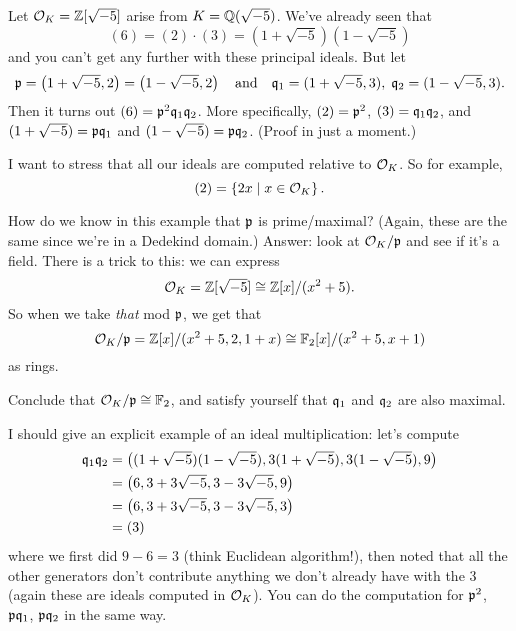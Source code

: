 \begin{example}
	Let $\mathcal O_K = \mathbb Z[\sqrt{-5}]$ arise from $K = \mathbb Q(\sqrt{-5})$.
	We've already seen that
	\[ (6) = (2) \cdot (3) = \left( 1+\sqrt{-5} \right)\left( 1-\sqrt{-5} \right) \]
	and you can't get any further with these principal ideals.
	But let
	\[ \mathfrak p = \left( 1+\sqrt{-5}, 2 \right) = \left( 1-\sqrt{-5}, 2 \right)
		\quad\text{and}\quad \mathfrak q_1 = (1+\sqrt{-5},3),
		\; \mathfrak q_2 = (1-\sqrt{-5},3). \]
	Then it turns out $(6) = \mathfrak p^2\mathfrak q_1\mathfrak q_2$.
	More specifically, $(2) = \mathfrak p^2$, $(3) = \mathfrak q_1\mathfrak q_2$,
	and $(1+\sqrt{-5}) = \mathfrak p\mathfrak q_1$ and $(1-\sqrt{-5}) = \mathfrak p\mathfrak q_2$.
	(Proof in just a moment.)
\end{example}
I want to stress that all our ideals are computed relative to $\mathcal O_K$.
So for example, \[ (2) = \left\{ 2x \mid x \in \mathcal O_K \right\}. \]

How do we know in this example that $\mathfrak p$ is prime/maximal?
(Again, these are the same since we're in a Dedekind domain.)
Answer: look at $\mathcal O_K / \mathfrak p$ and see if it's a field.
There is a trick to this: we can express
\[ \mathcal O_K = \mathbb Z[\sqrt{-5}] \cong \mathbb Z[x] / (x^2+5). \]
So when we take \emph{that} mod $\mathfrak p$, we get that
\[ \mathcal O_K / \mathfrak p = \mathbb Z[x] / (x^2+5, 2, 1+x) \cong \mathbb F_2[x] / (x^2+5,x+1) \]
as rings.
\begin{ques}
	Conclude that $\mathcal O_K / \mathfrak p \cong \mathbb F_2$,
	and satisfy yourself that $\mathfrak q_1$ and $\mathfrak q_2$ are also maximal.
\end{ques}
I should give an explicit example of an ideal multiplication: let's compute
\begin{align*}
	\mathfrak q_1\mathfrak q_2 &= \left( (1+\sqrt{-5})(1-\sqrt{-5}), 3(1+\sqrt{-5}), 3(1-\sqrt{-5}), 9 \right) \\
	&= \left( 6, 3+3\sqrt{-5}, 3-3\sqrt{-5}, 9 \right) \\
	&= \left( 6, 3+3\sqrt{-5}, 3-3\sqrt{-5}, 3 \right) \\
	&= (3)
\end{align*}
where we first did $9-6=3$ (think Euclidean algorithm!),
then noted that all the other generators don't contribute
anything we don't already have with the $3$
(again these are ideals computed in $\mathcal O_K$).
You can do the computation for $\mathfrak p^2$, $\mathfrak p\mathfrak q_1$, $\mathfrak p\mathfrak q_2$ in the same way.

